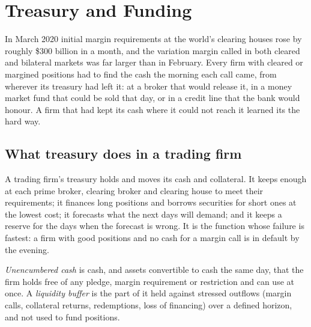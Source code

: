 \chapter{Treasury and Funding}\label{ch:fm:treasury-and-funding}

In March 2020 initial margin requirements at the world's clearing houses rose by roughly \$300 billion in a month, and the variation margin called
in both cleared and bilateral markets was far larger than in February. Every firm with cleared or margined positions had to find the cash the
morning each call came, from wherever its treasury had left it: at a broker that would release it, in a money market fund that could be sold that
day, or in a credit line that the bank would honour. A firm that had kept its cash where it could not reach it learned its  the
hard way.

\section{What treasury does in a trading firm}

A trading firm's treasury holds and moves its cash and collateral. It keeps enough at each prime broker, clearing broker and clearing house to meet
their requirements; it finances long positions and borrows securities for short ones at the lowest cost; it forecasts what the next days will
demand; and it keeps a reserve for the days when the forecast is wrong. It is the function whose failure is fastest: a firm with good positions and
no cash for a margin call is in default by the evening.

\begin{definition}\label{def:fm:treasury-and-funding:cash}
\emph{Unencumbered cash} is cash, and assets convertible to cash the same day, that the firm holds free of any pledge,
margin requirement or restriction and can use at once. A \emph{liquidity buffer} is the part of it held against stressed
outflows (margin calls, collateral returns, redemptions, loss of financing) over a defined horizon, and not used to fund positions.
\end{definition}

